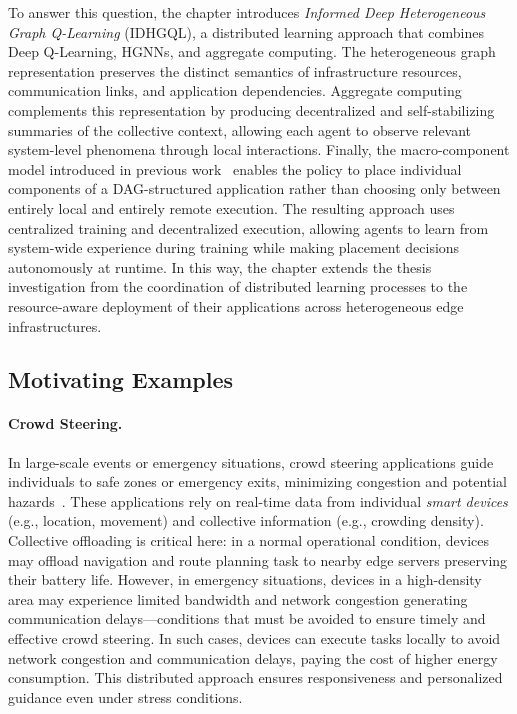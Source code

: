 To answer this question, 
 the chapter introduces \emph{Informed Deep Heterogeneous Graph Q-Learning} (IDHGQL), 
 a distributed learning approach that combines Deep Q-Learning, \glspl{HGNN}, and aggregate computing.
%
The heterogeneous graph representation preserves the distinct semantics of infrastructure resources, 
 communication links, and application dependencies.
%
Aggregate computing complements this representation by producing decentralized and self-stabilizing summaries 
 of the collective context, allowing each agent to observe relevant system-level phenomena through local interactions.
%
Finally, 
 the macro-component model introduced in previous work~\cite{acsos-model} enables the policy to place individual components 
  of a DAG-structured application rather than choosing only between entirely local and entirely remote execution.
%
The resulting approach uses centralized training and decentralized execution, 
 allowing agents to learn from system-wide experience during training
 while making placement decisions autonomously at runtime.
%
In this way, 
 the chapter extends the thesis investigation from the coordination of distributed learning processes 
 to the resource-aware deployment of their applications across heterogeneous edge infrastructures.

\subsection{Motivating Examples}\label{subsec:offloading-motivating-examples}
\paragraph{Crowd Steering.}
In large-scale events or emergency situations, 
 crowd steering applications guide individuals to safe zones or emergency exits, 
 minimizing congestion and potential hazards~\cite{DBLP:conf/IEEEcit/SassiBGMMZ15}.
%
These applications rely on real-time data from individual \emph{smart devices} 
 (e.g., location, movement) and collective information (e.g., crowding density).
%
Collective offloading is critical here: in a normal operational condition,
 devices may offload navigation and route planning task to nearby edge servers preserving their battery life.
%
However, in emergency situations,
 devices in a high-density area 
 may experience limited bandwidth and network congestion generating communication delays---conditions 
 that must be avoided to ensure timely and effective crowd steering.
%
In such cases,
 devices can execute tasks locally to avoid network congestion and communication delays,
 paying the cost of higher energy consumption.
%
This distributed approach ensures responsiveness 
 and personalized guidance even under stress conditions.

